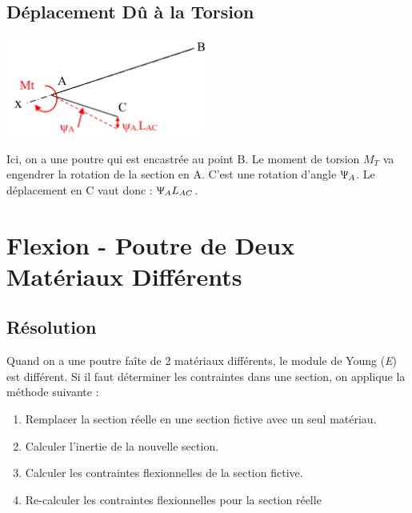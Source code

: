 \documentclass[a4paper]{article}
\begin{document}
\subsection{Déplacement Dû à la Torsion}





\begin{center} \includegraphics[width=0.5\textwidth]{images/Fleches03.PNG} \end{center}

Ici, on a une poutre qui est encastrée au point B. Le moment de torsion $ M_T $ va engendrer la rotation de la section en A. C'est une rotation d'angle $ \Uppsi_A $. Le déplacement en C vaut donc : $ \Uppsi_A L_{AC} $.











\section{Flexion - Poutre de Deux Matériaux Différents}





\subsection{Résolution}





Quand on a une poutre faîte de 2 matériaux différents, le module de Young (\emph{E}) est différent. Si il faut déterminer les contraintes dans une section, on applique la méthode suivante :
\begin{enumerate}

\item Remplacer la section réelle en une section fictive avec un seul matériau.
\item Calculer l'inertie de la nouvelle section.
\item Calculer les contraintes flexionnelles de la section fictive.
\item Re-calculer les contraintes flexionnelles pour la section réelle

\end{enumerate}
\end{document}
